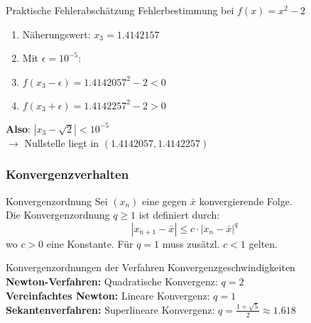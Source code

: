 \begin{example2}{Praktische Fehlerabschätzung} Fehlerbestimmung bei $f(x)=x^2-2$
    \vspace{-1mm}\\
    \begin{minipage}[t]{0.6\textwidth}
        \vspace{-3mm}
        \begin{enumerate}
            \item Näherungswert: $x_3 = 1.4142157$
            \item Mit $\epsilon = 10^{-5}$:
            \item $f(x_3-\epsilon) = 1.4142057^2 - 2 < 0$
            \item $f(x_3+\epsilon) = 1.4142257^2 - 2 > 0$
        \end{enumerate}
    \end{minipage}
    \begin{minipage}[t]{0.35\textwidth}
        \textbf{Also}: $|x_3-\sqrt{2}| < 10^{-5}$
        \vspace{-1mm}\\
        $\rightarrow$ Nullstelle liegt in $(1.4142057, 1.4142257)$
    \end{minipage}
\end{example2}

\subsubsection{Konvergenzverhalten}

\begin{definition}{Konvergenzordnung}
    Sei $(x_n)$ eine gegen $\bar{x}$ konvergierende Folge. \\
    Die Konvergenzordnung $q \geq 1$ ist definiert durch:
    \vspace{-2mm}\\
    $$|x_{n+1}-\bar{x}| \leq c \cdot |x_n-\bar{x}|^q$$
    wo $c > 0$ eine Konstante. Für $q = 1$ muss zusätzl. $c < 1$ gelten.
\end{definition}

\begin{theorem}{Konvergenzordnungen der Verfahren} Konvergenzgeschwindigkeiten
    \vspace{-2mm}\\
    \textbf{Newton-Verfahren:} Quadratische Konvergenz: $q = 2$
    \vspace{1mm}\\
    \textbf{Vereinfachtes Newton:} Lineare Konvergenz: $q = 1$
    \vspace{1mm}\\
    \textbf{Sekantenverfahren:} Superlineare Konvergenz: $q = \frac{1+\sqrt{5}}{2} \approx 1.618$
\end{theorem}

